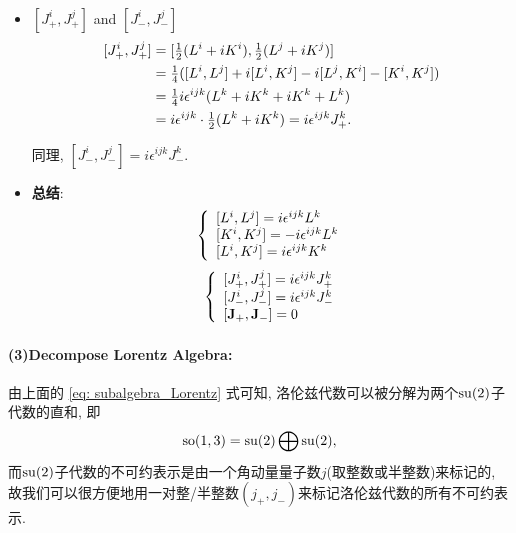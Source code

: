 \begin{itemize}
\begin{equation}
\begin{aligned}
          \end{aligned}
        \end{equation}
  \item $[J_+^i, J_+^j]$ and $[J_-^i, J_-^j]$
        \begin{equation}
          \begin{aligned}
            \relax[J_+^i, J_+^j] & = [\tfrac{1}{2}(L^i+iK^i), \tfrac{1}{2}(L^j+iK^j)]                   \\
                                 & = \tfrac{1}{4}([L^i, L^j]+i[L^i, K^j]-i[L^j, K^i]-[K^i, K^j])        \\
                                 & = \tfrac{1}{4}i\epsilon^{ijk}(L^k + iK^k + iK^k + L^k)               \\
                                 & = i\epsilon^{ijk}\cdot\tfrac{1}{2}(L^k+iK^k) = i\epsilon^{ijk}J_+^k.
          \end{aligned}
        \end{equation}

        同理, $[J_-^i, J_-^j] = i\epsilon^{ijk}J_-^k$.
  \item \textbf{总结}:
        \begin{equation}
          \left\{\begin{array}{l}
            \relax[L^i, L^j] = i\epsilon^{ijk}L^k  \\
            \relax[K^i, K^j] = -i\epsilon^{ijk}L^k \\
            \relax[L^i, K^j] = i\epsilon^{ijk}K^k
          \end{array} \right.
        \end{equation}
        \begin{equation}{\label{eq: subalgebra_Lorentz}}
          \left\{\begin{array}{l}
            \relax[J_+^i, J_+^j] = i\epsilon^{ijk}J_+^k \\
            \relax[J_-^i, J_-^j] = i\epsilon^{ijk}J_-^k \\
            \relax[\mathbf{J}_+, \mathbf{J}_-] = 0
          \end{array} \right.
        \end{equation}
\end{itemize}

\paragraph*{(3)Decompose Lorentz Algebra: }
由上面的 \eqref{eq: subalgebra_Lorentz} 式可知, 洛伦兹代数可以被分解为两个${\rm su}(2)$子代数的直和, 即
\begin{equation}
  {\rm so}(1, 3) = {\rm su}(2) \bigoplus {\rm su}(2),
\end{equation}
而${\rm su}(2)$子代数的不可约表示是由一个角动量量子数$j$(取整数或半整数)来标记的, 故我们可以很方便地用一对整/半整数$(j_+, j_-)$来标记洛伦兹代数的所有不可约表示.

